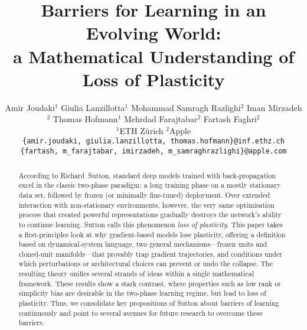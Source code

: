 \documentclass{article}
\title{Barriers for Learning in an Evolving World: \\a Mathematical Understanding of Loss of Plasticity}
\author{%
  Amir Joudaki$^{1}$ \And
  Giulia Lanzillotta$^{1}$ \And
  Mohammad Samragh Razlighi$^{2}$ \And
  Iman Mirzadeh$^{2}$ \And
  Thomas Hofmann$^{1}$ \And
  Mehrdad Farajtabar$^{2}$ \And
  Fartash Faghri$^{2}$ \And
  \vspace{-20pt}
  \\
  $^{1}$ETH Zürich
  $^{2}$Apple \\
  \texttt{\{amir.joudaki, giulia.lanzillotta, thomas.hofmann\}@inf.ethz.ch} \\
  \texttt{\{fartash, m\_farajtabar, imirzadeh, m\_samraghrazlighi\}@apple.com}
}
\begin{document}
\maketitle

\begin{abstract}
According to Richard~Sutton, standard deep models trained with back‑propagation excel in the classic two‑phase paradigm: a long training phase on a mostly stationary data set, followed by frozen (or minimally fine‑tuned) deployment.  
Over extended interaction with non‑stationary environments, however, the very same optimisation process that created powerful representations gradually destroys the network's ability to continue learning.  
Sutton calls this phenomenon \emph{loss of plasticity}.  
This paper takes a first‑principles look at why gradient‑based models lose plasticity, offering
a definition based on dynamical‑system language,  
two general mechanisms—frozen units and cloned‑unit manifolds—that provably trap gradient trajectories, and  
conditions under which perturbations or architectural choices can prevent or undo the collapse.  
The resulting theory unifies several strands of ideas within a single mathematical framework. These results show a stark contrast, where properties such as low rank or simplicity bias are desirable in the two-phase learning regime, but lead to loss of plasticity. Thus, we consolidate key propositions of Sutton about barriers of learning continuously and point to several avenues for future research to overcome these barriers. 
\end{abstract}
\end{document}
